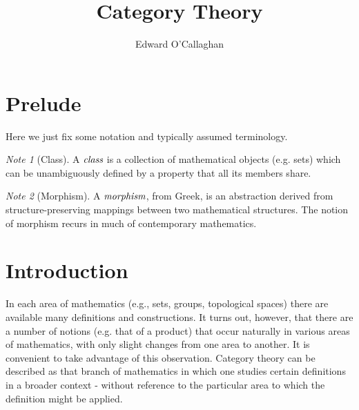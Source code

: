 \documentclass[10pt, oneside, reqno]{amsart}
\title{Category Theory}                               %
\author{Edward O'Callaghan}
\theoremstyle{plain}%
\theoremstyle{definition}
\theoremstyle{remark}
\newtheorem*{note}{Note}
\begin{document}
\maketitle \tableofcontents \clearpage

\section{Prelude} %
\label{sec:purelude}
Here we just fix some notation and typically assumed terminology.

\begin{note}[Class]
 A $\emph{class}$ is a collection of mathematical objects (e.g. sets)
 which can be unambiguously defined by a property that all its members share.
\end{note}

\begin{note}[Morphism]
 A $\emph{morphism}$, from Greek, is an abstraction derived from
 structure-preserving mappings between two mathematical structures.
 The notion of morphism recurs in much of contemporary mathematics.
\end{note}


\section{Introduction} %
\label{sec:introduction}
In each area of mathematics (e.g., sets, groups, topological spaces) there are available many definitions
and constructions. It turns out, however, that there are a number of notions (e.g. that of a product)
that occur naturally in various areas of mathematics, with only slight changes from one area to another.
It is convenient to take advantage of this observation. Category theory can be described as that branch of mathematics
in which one studies certain definitions in a broader context - without reference to the particular area to which
the definition might be applied.
\end{document}
